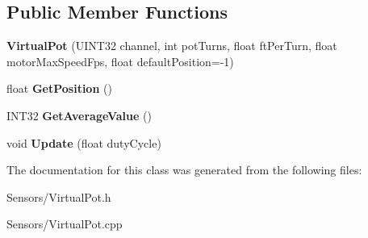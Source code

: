 \subsection*{\-Public \-Member \-Functions}
\begin{DoxyCompactItemize}
\item 
\hypertarget{class_virtual_pot_a5d0e99cd75b6cc60dbe0b698c0e59024}{
{\bfseries \-Virtual\-Pot} (\-U\-I\-N\-T32 channel, int pot\-Turns, float ft\-Per\-Turn, float motor\-Max\-Speed\-Fps, float default\-Position=-\/1)}
\label{class_virtual_pot_a5d0e99cd75b6cc60dbe0b698c0e59024}

\item 
\hypertarget{class_virtual_pot_a747db41fd70011eb652c47826bdad232}{
float {\bfseries \-Get\-Position} ()}
\label{class_virtual_pot_a747db41fd70011eb652c47826bdad232}

\item 
\hypertarget{class_virtual_pot_a526bc3a7893ca85b063674397d3d1df7}{
\-I\-N\-T32 {\bfseries \-Get\-Average\-Value} ()}
\label{class_virtual_pot_a526bc3a7893ca85b063674397d3d1df7}

\item 
\hypertarget{class_virtual_pot_a507522bca863c0465dce315e6bdbd5d8}{
void {\bfseries \-Update} (float duty\-Cycle)}
\label{class_virtual_pot_a507522bca863c0465dce315e6bdbd5d8}

\end{DoxyCompactItemize}


\-The documentation for this class was generated from the following files\-:\begin{DoxyCompactItemize}
\item 
\-Sensors/\-Virtual\-Pot.\-h\item 
\-Sensors/\-Virtual\-Pot.\-cpp\end{DoxyCompactItemize}
